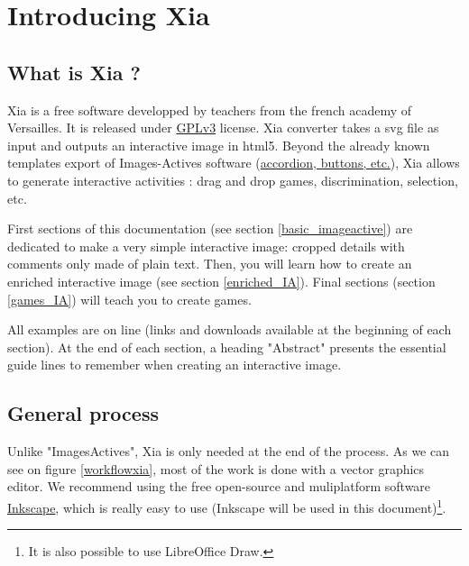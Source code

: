 




 \maketitle
 \tableofcontents
  
\section{Introducing Xia}

\subsection{What is Xia ?}

Xia is a free software developped by teachers from the french academy of Versailles.
It is released under \href{http://www.gnu.org/copyleft/gpl.html}{GPLv3} license.
Xia converter takes a svg file as input and outputs an interactive image in 
html5. Beyond the already known templates export of Images-Actives software
(\href{http://images-actives.crdp-versailles.fr/spip.php?article11\&lang=fr}
{accordion, buttons, etc.}), Xia allows to generate
interactive activities : drag and drop games, discrimination, selection, etc.

First sections of this documentation (see section \ref{basic_imageactive}) are dedicated to make a very simple 
interactive image: cropped details with comments only made of plain text.
Then, you will learn how to create an enriched interactive image (see section \ref{enriched_IA}). Final sections (section \ref{games_IA}) will teach you to create games.

\begin{astuce}
All examples are on line (links and downloads available at 
the beginning of each section). At the end
of each section, a heading "Abstract" presents the essential guide lines to 
remember when creating an interactive image. 
\end{astuce}

\subsection{General process}

Unlike "ImagesActives", Xia is only needed at the end of the process.
As we can see on figure \ref{workflowxia}, most of the work is done with 
a  vector graphics editor. We recommend using the free open-source and 
muliplatform software \href{http://www.inkscape.org/}{Inkscape}, which is 
really easy to use (Inkscape will be used in this document)\footnote{It is also possible 
to use LibreOffice Draw.}.

